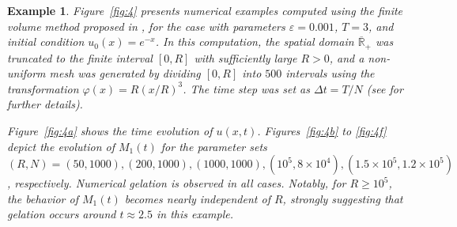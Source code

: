 \documentclass[a4paper,11pt]{article}
\newtheorem{ex}[thm]{Example}
\def\Rb{\overline{{\mathbb R}}_+}
\begin{document}
\begin{ex}
{Figure~\ref{fig:4} presents numerical examples computed using the finite volume method proposed in \cite{Filbet-Laurencot2004}, for the case with parameters $\varepsilon = 0.001$, $T = 3$, and initial condition $u_0(x) = e^{-x}$. In this computation, the spatial domain $\Rb$ was truncated to the finite interval $[0, R]$ with sufficiently large $R > 0$, and a non-uniform mesh was generated by dividing $[0, R]$ into $500$ intervals using the transformation $\varphi(x) = R(x/R)^3$. The time step was set as $\Delta t = T/N$ (see \cite{Filbet-Laurencot2004,Miyata2025} for further details).

Figure~\ref{fig:4a} shows the time evolution of $u(x,t)$. Figures~\ref{fig:4b} to \ref{fig:4f} depict the evolution of $M_1(t)$ for the parameter sets $(R,N) = (50, 1000),(200, 1000),(1000, 1000),(10^5, 8\times 10^4),(1.5\times 10^5, 1.2\times 10^5)$, respectively. Numerical gelation is observed in all cases. Notably, for $R \ge 10^5$, the behavior of $M_1(t)$ becomes nearly independent of $R$, strongly suggesting that gelation occurs around $t \approx 2.5$ in this example.
}
\end{ex}
\end{document}
